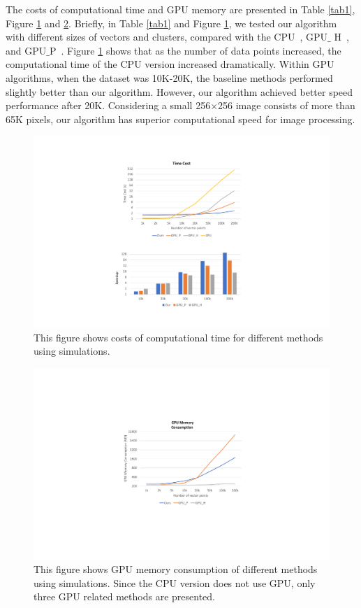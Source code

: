 \documentclass[journal,twoside,web]{ieeecolor}
\begin{document}

The costs of computational time and GPU memory are presented in Table \ref{tab1}, Figure \ref{fig7} and \ref{fig8}. Briefly, in Table \ref{tab1} and Figure \ref{fig7}, we tested our algorithm with different sizes of vectors and clusters, compared with the CPU~\cite{b33}, GPU$\_$ H~\cite{b19}, and GPU$\_$P~\cite{b18}. Figure \ref{fig7} shows that as the number of data points increased, the computational time of the CPU version increased dramatically. Within GPU algorithms, when the dataset was 10K-20K, the baseline methods performed slightly better than our algorithm. However, our algorithm achieved better speed performance after 20K. Considering a small 256$\times$256 image consists of more than 65K pixels, our algorithm has superior computational speed for image processing. 

\begin{figure}[h]
\centerline{\includegraphics[width=\columnwidth]{7.pdf}}
\caption{This figure shows costs of computational time for different methods using simulations.}
\label{fig7}
\end{figure}

\begin{figure}[h]
\centerline{\includegraphics[width=\columnwidth]{8.pdf}}
\caption{This figure shows GPU memory consumption of different methods using simulations. Since the CPU version does not use GPU, only three GPU related methods are presented.}
\label{fig8}
\end{figure}
\end{document}
